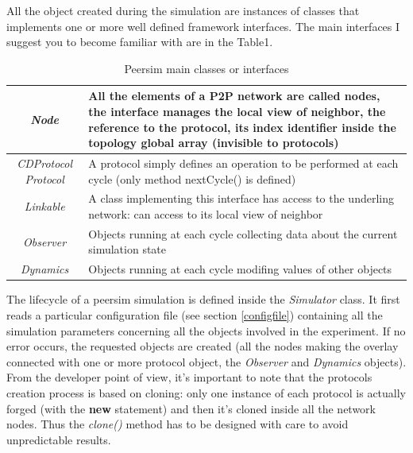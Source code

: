 \documentclass[a4paper,12pt]{article}
\begin{document}
All the object created during the simulation are instances of classes
that implements one or more well defined framework interfaces. The
main interfaces I suggest you to become familiar with are in the Table1. 

\label{table1}%
\begin{table}
\begin{center}\begin{tabular}{|c|p{2.5in}|}
\hline 
\emph{Node}&
All the elements of a P2P network are called nodes, the interface
manages the local view of neighbor, the reference to the protocol,
its index identifier inside the topology global array (invisible to
protocols)\\
\hline 
\emph{CDProtocol Protocol}&
A protocol simply defines an operation to be performed at each cycle
(only method nextCycle() is defined)\\
\hline 
\emph{Linkable}&
A class implementing this interface has access to the underling network:
can access to its local view of neighbor\\
\hline 
\emph{Observer}&
Objects running at each cycle collecting data about the current simulation
state\\
\hline 
\emph{Dynamics}&
Objects running at each cycle modifing values of other objects\\
\hline
\end{tabular}\end{center}


\caption{Peersim main classes or interfaces}
\end{table}


The lifecycle of a peersim simulation is defined inside the \emph{Simulator}
class. It first reads a particular configuration file (see section 
\ref{configfile}) containing all the simulation parameters 
concerning all the
objects involved in the experiment. If no error occurs, the requested
objects are created (all the nodes making the overlay connected with
one or more protocol object, the \emph{Observer} and
\emph{Dynamics} objects).
From the developer point of view, it's important to note that the
protocols creation process is based on cloning: only one instance
of each protocol is actually forged (with the \textbf{new} statement)
and then it's cloned inside all the network nodes. Thus the 
\emph{clone()} method has to be designed with care to avoid 
unpredictable results.
\end{document}
